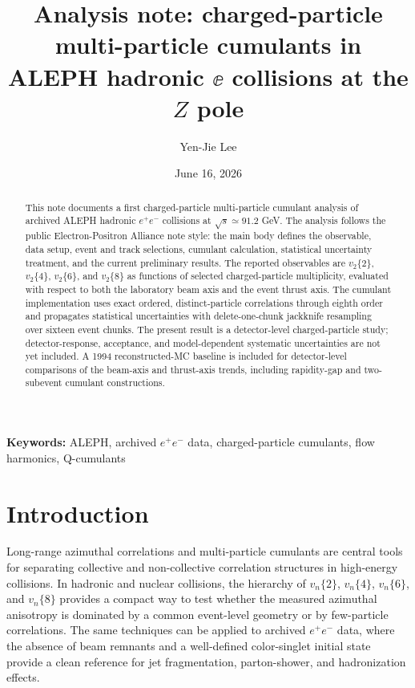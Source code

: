 \documentclass{article}
\title{Analysis note: charged-particle multi-particle cumulants in ALEPH hadronic \(\ee\) collisions at the \(Z\) pole}
\author{Yen-Jie Lee}
\date{June 16, 2026}
\newcommand{\vn}[2]{\ensuremath{v_{#1}\{#2\}}}
\begin{document}
\maketitle

\begin{abstract}
This note documents a first charged-particle multi-particle cumulant analysis
of archived ALEPH hadronic \(e^+e^-\) collisions at \(\sqrt{s}\simeq91.2\) GeV.
The analysis follows the public Electron-Positron Alliance note style: the
main body defines the observable, data setup, event and track selections,
cumulant calculation, statistical uncertainty treatment, and the current
preliminary results. The reported observables are \(\vn{2}{2}\),
\(\vn{2}{4}\), \(\vn{2}{6}\), and \(\vn{2}{8}\) as functions of selected
charged-particle multiplicity, evaluated with respect to both the laboratory
beam axis and the event thrust axis. The cumulant implementation uses exact
ordered, distinct-particle correlations through eighth order and propagates
statistical uncertainties with delete-one-chunk jackknife resampling over
sixteen event chunks. The present result is a detector-level charged-particle
study; detector-response, acceptance, and model-dependent systematic
uncertainties are not yet included. A 1994 reconstructed-MC baseline is included for detector-level comparisons
of the beam-axis and thrust-axis trends, including rapidity-gap and two-subevent
cumulant constructions.
\end{abstract}

\noindent\textbf{Keywords:} ALEPH, archived \(e^+e^-\) data, charged-particle
cumulants, flow harmonics, Q-cumulants

\tableofcontents
\clearpage

\section{Introduction}

Long-range azimuthal correlations and multi-particle cumulants are central
tools for separating collective and non-collective correlation structures in
high-energy collisions. In hadronic and nuclear collisions, the hierarchy of
\(\vn{n}{2}\), \(\vn{n}{4}\), \(\vn{n}{6}\), and \(\vn{n}{8}\) provides a
compact way to test whether the measured azimuthal anisotropy is dominated by a
common event-level geometry or by few-particle correlations. The same
techniques can be applied to archived \(e^+e^-\) data, where the absence of
beam remnants and a well-defined color-singlet initial state provide a clean
reference for jet fragmentation, parton-shower, and hadronization effects.
\end{document}
